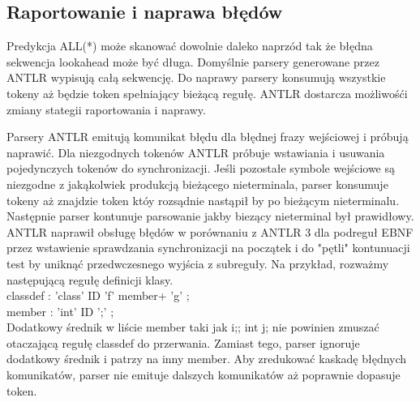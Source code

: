 \subsection{Raportowanie i naprawa błędów}
Predykcja ALL(*) może skanować dowolnie daleko naprzód tak że
błędna sekwencja lookahead może być długa. Domyślnie parsery
generowane przez ANTLR wypisują całą sekwencję. Do naprawy
parsery konsumują wszystkie tokeny aż będzie token
spełniający bieżącą regułę.
ANTLR dostarcza możliwośći zmiany stategii raportowania i naprawy.
\par
Parsery ANTLR emitują komunikat błędu dla błędnej frazy wejściowej
i próbują naprawić. Dla niezgodnych tokenów ANTLR
próbuje wstawiania i usuwania pojedynczych tokenów do synchronizacji.
Jeśli pozostałe symbole wejściowe są niezgodne z jakąkolwiek
produkcją bieżącego nieterminala, parser konsumuje tokeny aż znajdzie
token któy rozsądnie nastąpił by po bieżącym nieterminalu.
Następnie parser kontunuje parsowanie jakby biezący nieterminal
był prawidłowy. ANTLR naprawił obsługę błędów w porównaniu z ANTLR
3 dla podreguł EBNF przez wstawienie sprawdzania synchronizacji
na początek i do "pętli" kontunuacji test by uniknąć przedwczesnego
wyjścia z subreguły. Na przykład, rozważmy następującą regułę
definicji klasy.\\
classdef : 'class' ID 'f' member+ 'g' ;\\
member : 'int' ID ';' ;\\
Dodatkowy średnik w liście member taki jak i;; int
j; nie powinien zmuszać otaczającą regułę classdef do przerwania.
Zamiast tego, parser ignoruje dodatkowy średnik i patrzy na inny
member. Aby zredukować kaskadę błędnych komunikatów, parser
nie emituje dalszych komunikatów aż poprawnie dopasuje token.
